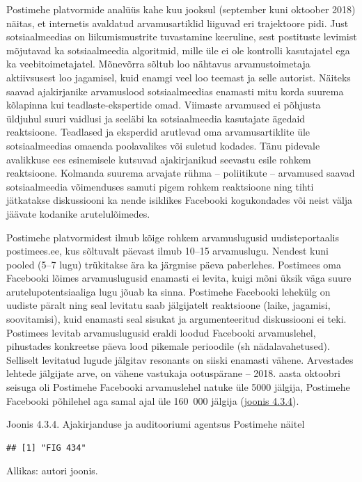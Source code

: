 \documentclass[estonian,]{article}
\begin{document}
Postimehe platvormide analüüs kahe kuu jooksul (september kuni oktoober 2018) näitas, et internetis avaldatud arvamusartiklid liiguvad eri trajektoore pidi. Just sotsiaalmeedias on liikumismustrite tuvastamine keeruline, sest postituste levimist mõjutavad ka sotsiaalmeedia algoritmid, mille üle ei ole kontrolli kasutajatel ega ka veebitoimetajatel. Mõnevõrra sõltub loo nähtavus arvamustoimetaja aktiivsusest loo jagamisel, kuid enamgi veel loo teemast ja selle autorist. Näiteks saavad ajakirjanike arvamuslood sotsiaalmeedias enamasti mitu korda suurema kõlapinna kui teadlaste-ekspertide omad. Viimaste arvamused ei põhjusta üldjuhul suuri vaidlusi ja seeläbi ka sotsiaalmeedia kasutajate ägedaid reaktsioone. Teadlased ja eksperdid arutlevad oma arvamusartiklite üle sotsiaalmeedias omaenda poolavalikes või suletud kodades. Tänu pidevale avalikkuse ees esinemisele kutsuvad ajakirjanikud seevastu esile rohkem reaktsioone. Kolmanda suurema arvajate rühma -- poliitikute -- arvamused saavad sotsiaalmeedia võimenduses samuti pigem rohkem reaktsioone ning tihti jätkatakse diskussiooni ka nende isiklikes Facebooki kogukondades või neist välja jäävate kodanike arutelulõimedes.

Postimehe platvormidest ilmub kõige rohkem arvamuslugusid uudisteportaalis postimees.ee, kus sõltuvalt päevast ilmub 10--15 arvamuslugu. Nendest kuni pooled (5--7 lugu) trükitakse ära ka järgmise päeva paberlehes. Postimees oma Facebooki lõimes arvamuslugusid enamasti ei levita, kuigi mõni üksik väga suure arutelupotentsiaaliga lugu jõuab ka sinna. Postimehe Facebooki lehekülg on uudiste päralt ning seal levitatu saab jälgijatelt reaktsioone (laike, jagamisi, soovitamisi), kuid enamasti seal sisukat ja argumenteeritud diskussiooni ei teki. Postimees levitab arvamuslugusid eraldi loodud Facebooki arvamuslehel, pihustades konkreetse päeva lood pikemale perioodile (sh nädalavahetused). Selliselt levitatud lugude jälgitav resonants on siiski enamasti vähene. Arvestades lehtede jälgijate arve, on vähene vastukaja ootuspärane -- 2018. aasta oktoobri seisuga oli Postimehe Facebooki arvamuslehel natuke üle 5000 jälgija, Postimehe Facebooki põhilehel aga samal ajal üle 160~000 jälgija (\protect\hyperlink{figure434}{joonis 4.3.4}).

{Joonis 4.3.4.} Ajakirjanduse ja auditooriumi agentsus Postimehe näitel

\begin{verbatim}
## [1] "FIG 434"
\end{verbatim}

\begin{imgsource}
{Allikas:} autori joonis.
\end{imgsource}
\end{document}
